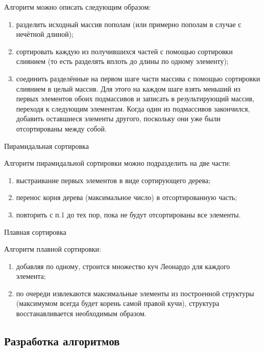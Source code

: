 \documentclass[12pt,a4paper]{scrartcl}
\begin{document}
Алгоритм можно описать следующим образом:
\begin{enumerate}
	\item разделить исходный массив пополам (или примерно пополам в случае с нечётной длиной);
	\item сортировать каждую из получившихся частей с помощью сортировки слиянием (то есть разделять вплоть до длины по одному элементу);
	\item соединить разделённые на первом шаге части массива с помощью сортировки слиянием в целый массив. Для этого на каждом шаге взять меньший из первых элементов обоих подмассивов и записать в результирующий массив, переходя к следующим элементам. Когда один из подмассивов закончился, добавить оставшиеся элементы другого, поскольку они уже были отсортированы между собой.
\end{enumerate}
\cite{MergeSort}

\begin{center}
Пирамидальная сортировка
\end{center}

Алгоритм пирамидальной сортировки можно подразделить на две части:
\begin{enumerate}
	\item выстраивание первых элементов в виде сортирующего дерева;
	\item перенос корня дерева (максимальное число) в отсортированную часть;
	\item повторить с п.1 до тех пор, пока не будут отсортированы все элементы.
\end{enumerate}
\cite{Alg}

\begin{center}
Плавная сортировка
\end{center}

Алгоритм плавной сортировки:
\begin{enumerate}
	\item добавляя по одному, строится множество куч Леонардо для каждого элемента;
	\item по очереди извлекаются максимальные элементы из построенной структуры (максимумом всегда будет корень самой правой кучи), структура восстанавливается необходимым образом.
\end{enumerate}
\cite{SmD}

\subsection{Разработка алгоритмов}
\end{document}
